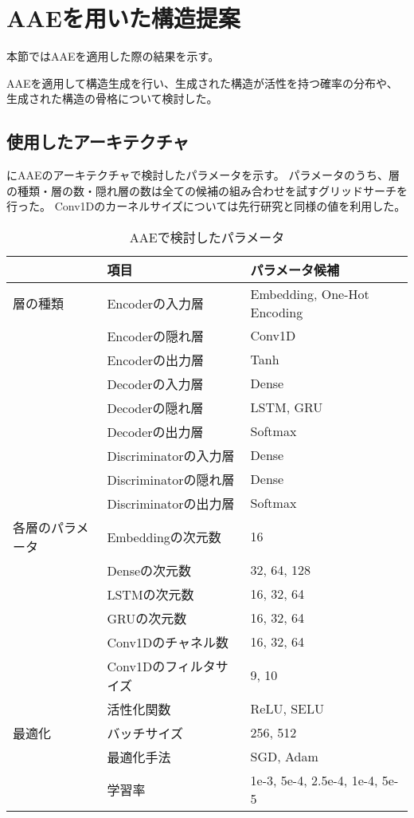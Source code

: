 \section{AAEを用いた構造提案} \label{sec:result_aae}

本節ではAAEを適用した際の結果を示す。

AAEを適用して構造生成を行い、生成された構造が活性を持つ確率の分布や、生成された構造の骨格について検討した。

\subsection{使用したアーキテクチャ} \label{sec:aae_architecture}

にAAEのアーキテクチャで検討したパラメータを示す。
パラメータのうち、層の種類・層の数・隠れ層の数は全ての候補の組み合わせを試すグリッドサーチを行った。
Conv1Dのカーネルサイズについては先行研究と同様の値を利用した。
\begin{table}[tbp]
    \centering
\caption{AAEで検討したパラメータ} \label{tb:aae_parameter_search}
\begin{tabular}{lll}\hline
& 項目 & パラメータ候補 \\\hline
層の種類 & Encoderの入力層 & Embedding, One-Hot Encoding \\
& Encoderの隠れ層 & Conv1D \\
& Encoderの出力層 & Tanh \\
& Decoderの入力層 & Dense \\
& Decoderの隠れ層 & LSTM, GRU \\
& Decoderの出力層 & Softmax \\
& Discriminatorの入力層 & Dense \\
& Discriminatorの隠れ層 & Dense \\
& Discriminatorの出力層 & Softmax \\\hline
各層のパラメータ & Embeddingの次元数 & 16 \\
& Denseの次元数 & 32, 64, 128 \\
& LSTMの次元数 & 16, 32, 64 \\
& GRUの次元数 & 16, 32, 64 \\
& Conv1Dのチャネル数 & 16, 32, 64 \\
& Conv1Dのフィルタサイズ & 9, 10 \\
& 活性化関数 & ReLU, SELU \\\hline
最適化 & バッチサイズ & 256, 512 \\
& 最適化手法 & SGD, Adam \\
& 学習率 & 1e-3, 5e-4, 2.5e-4, 1e-4, 5e-5 \\\hline
\end{tabular}
\end{table}

